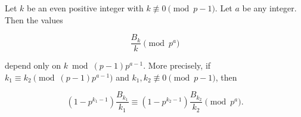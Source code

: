Let $k$ be an even positive integer with $k \not\equiv 0 \pmod{p-1}$. Let $a$ be any
integer. Then the values

$$\frac{B_k}{k} \pmod{p^a}$$

depend only on $k \bmod (p-1)p^{a-1}$. More precisely, if $k_1 \equiv k_2 \pmod{(p-1)p^{a-1}}$
and $k_1, k_2 \not\equiv 0 \pmod{p-1}$, then

$$(1 - p^{k_1-1}) \frac{B_{k_1}}{k_1} \equiv (1 - p^{k_2-1}) \frac{B_{k_2}}{k_2} \pmod{p^a}.$$
